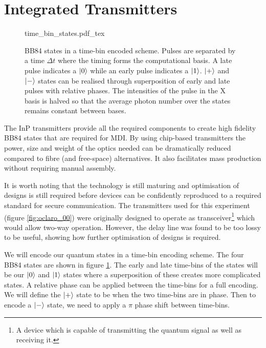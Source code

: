 \section{Integrated Transmitters}

\begin{figure}[tp]
	\centering
	\small
	\def\svgwidth{0.9\textwidth} 
	{time_bin_states.pdf_tex}
	\caption[BB84 time-bin encoding]{BB84 states in a time-bin encoded scheme. Pulses are separated by a time $\Delta t$ where the timing forms the computational basis. A late pulse indicates a $\ket{0}$ while an early pulse indicates a $\ket{1}$. $\ket{+}$ and $\ket{-}$ states can be realised through superposition of early and late pulses with relative phases. The intensities of the pulse in the X basis is halved so that the average photon number over the states remains constant between bases.}
	\label{fig:BB84_time_bin}
\end{figure}

The \ac{InP} transmitters provide all the required components to create high fidelity BB84 states that are required for \ac{MDI}. By using chip-based transmitters the power, size and weight of the optics needed can be dramatically reduced compared to fibre (and free-space) alternatives. It also facilitates mass production without requiring manual assembly. 

It is worth noting that the technology is still maturing and optimisation of designs is still required before devices can be confidently reproduced to a required standard for secure communication. The transmitters used for this experiment (figure \ref{fig:oclaro_00}) were originally designed to operate as transceiver\footnote{A device which is capable of transmitting the quantum signal as well as receiving it.} which would allow two-way operation. However, the delay line was found to be too lossy to be useful, showing how further optimisation of designs is required.

We will encode our quantum states in a time-bin encoding scheme. The four BB84 states are shown in figure \ref{fig:BB84_time_bin}. The early and late time-bins of the states will be our $\ket{0}$ and $\ket{1}$ states where a superposition of these creates more complicated states. A relative phase can be applied between the time-bins for a full encoding. We will define the $\ket{+}$ state to be when the two time-bins are in phase. Then to encode a $\ket{-}$ state, we need to apply a $\pi$ phase shift between time-bins. 

